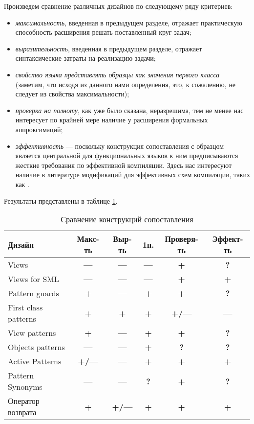 Произведем сравнение различных дизайнов по следующему ряду критериев:
\begin{itemize}
\item \textit{максимальность}, введенная в предыдущем разделе, отражает практическую способность расширения решать поставленный круг \mbox{задач};
\item \textit{выразительность}, введенная в предыдущем разделе, отражает синтаксические затраты на реализацию задачи;
\item \textit{свойство языка представлять образцы как значения первого \mbox{класса}} (заметим, что исходя из данного нами определения, это, к сожалению, не следует из свойства максимальности);
\item \textit{проверка на полноту}, как уже было сказана, неразрешима, тем не менее нас интересует по крайней мере наличие у расширения формальных аппроксимаций;
\item \textit{эффективность} --- поскольку конструкция сопоставления с образцом является центральной для функциональных языков к ним предписываются жесткие требования по эффективной компиляции. Здесь нас интересуют наличие в литературе модификаций для эффективных схем компиляции, таких как \cite{fessant2001optimizing, maranget2008decisiontrees, scott2000whendo}.
\end{itemize}

Результаты представлены в таблице \ref{tab:comparison}.

\begin{table}[H]
\centering
\begin{tabular}{l|c|c|c|c|c}
Дизайн               & Макс-ть        & Выр-ть     & 1п.          & Проверя-ть      & Эффект-ть      \\ \hline
Views                & \textbf{---}   & \textbf{---} & \textbf{---} & \textbf{+}      & \textbf{?}     \\
Views for SML        & \textbf{---}   & \textbf{---} & \textbf{---} & \textbf{+}      & \textbf{+}     \\
Pattern guards       & \textbf{+}     & \textbf{---} & \textbf{+}   & \textbf{+}      & \textbf{?}     \\
First class patterns & \textbf{+}     & \textbf{+}   & \textbf{+}   & \textbf{+/---}     & \textbf{---}  \\
View patterns        & \textbf{+}     & \textbf{---} & \textbf{+}   & \textbf{+}      & \textbf{?}     \\
Objects patterns     & \textbf{---}   & \textbf{---} & \textbf{+}   & \textbf{?}     & \textbf{?}     \\
Active Patterns      & \textbf{+/---}  & \textbf{---} & \textbf{+}   & \textbf{+}      & \textbf{+}     \\
Pattern Synonyms     & \textbf{---}   & \textbf{---} & \textbf{?}   & \textbf{+}      & \textbf{?}     \\
Оператор возврата    & \textbf{+}     & \textbf{+/---} & \textbf{+}  & \textbf{+}      & \textbf{+}     \\
\end{tabular}
\caption{\label{tab:comparison} Сравнение конструкций сопоставления}
\end{table}


